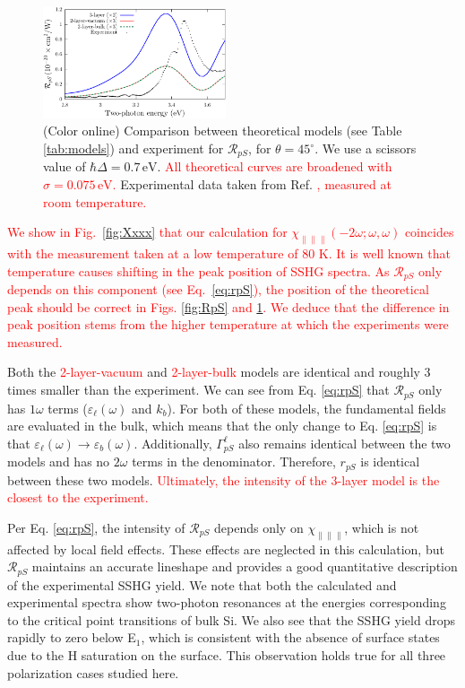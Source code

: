 \documentclass[prb,superscriptaddress,showpacs,twocolumn,letterpaper]{revtex4}
\newcommand{\correction}[1]{\textcolor{red}{#1}}
\begin{document}
\begin{figure}[b]
\centering
\includegraphics[width=0.48\textwidth]{fig4}
\caption{(Color online) Comparison between theoretical models (see Table
\ref{tab:models}) and experiment for $\mathcal{R}_{pS}$, for $\theta=45^\circ$.
We use a scissors value of $\hbar\Delta = 0.7\,\text{eV}$.
\correction{All theoretical curves are broadened with $\sigma=0.075\,\text{eV}$.
} %
Experimental data taken from Ref.
\correction{, measured at room temperature.} %
\label{fig:mitchellRpS}}
\end{figure}

\correction{
We show in Fig.~\ref{fig:Xxxx} that our calculation for
$\chi_{\parallel\parallel\parallel}(-2\omega;\omega,\omega)$ coincides with the
measurement taken at a low temperature of 80 K. It is well
known that temperature causes shifting in the peak position of SSHG
spectra.\cite{dadapPRB97}
As $\mathcal{R}_{pS}$ only depends on this component
(see Eq.~\eqref{eq:rpS}), the position
of the theoretical peak should be correct in 
Figs. 
\ref{fig:RpS} and \ref{fig:mitchellRpS}.
We deduce that 
the difference in peak position stems from the higher  temperature at which the
experiments were measured. 
} %

Both the \correction{2-layer-vacuum} and \correction{2-layer-bulk} models are
identical and roughly 3 times smaller than the experiment. We can see from Eq.
\eqref{eq:rpS} that $\mathcal{R}_{pS}$ only has $1\omega$ terms
($\varepsilon_{\ell}(\omega)$ and $k_{b}$). For both of these models, the
fundamental fields are evaluated in the bulk, which means that the only change
to Eq. \eqref{eq:rpS} is that $\varepsilon_{\ell}(\omega)
\rightarrow \varepsilon_{b}(\omega)$. Additionally, $\Gamma^{\ell}_{pS}$ also
remains identical between the two models and has no $2\omega$ terms in the
denominator. Therefore, $r_{pS}$ is identical between these two models.
\correction{Ultimately, the intensity of the \correction{3-layer} model is the
closest to the experiment.} %

Per Eq. \eqref{eq:rpS}, the intensity of $\mathcal{R}_{pS}$ depends only on
$\chi_{\parallel\parallel\parallel}$, which is not affected by local field
effects.\cite{tancognedejean:tel-01235611} These effects are neglected in this
calculation, but $\mathcal{R}_{pS}$ maintains an accurate lineshape and provides
a good quantitative description of the experimental SSHG yield. We note that
both the calculated and experimental spectra show two-photon resonances at the
energies corresponding to the critical point transitions of bulk Si. We also see
that the SSHG yield drops rapidly to zero below E$_{1}$, which is consistent
with the absence of surface states due to the H saturation on the surface. This
observation holds true for all three polarization cases studied here.
\end{document}
